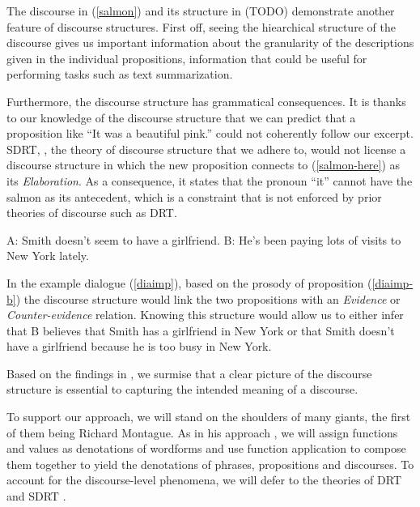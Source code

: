 
The discourse in (\ref{salmon}) and its structure in (TODO) demonstrate
another feature of discourse structures. First off, seeing the
hiearchical structure of the discourse gives us important information
about the granularity of the descriptions given in the individual
propositions, information that could be useful for performing tasks such
as text summarization.

Furthermore, the discourse structure has grammatical consequences. It is
thanks to our knowledge of the discourse structure that we can predict
that a proposition like ``It was a beautiful pink.''  could not
coherently follow our excerpt. SDRT, \cite{asher2003logics}, the theory
of discourse structure that we adhere to, would not license a discourse
structure in which the new proposition connects to (\ref{salmon-here})
as its \emph{Elaboration}. As a consequence, it states that the pronoun
``it'' cannot have the salmon as its antecedent, which is a constraint
that is not enforced by prior theories of discourse such as DRT.

\begin{exe}
  \ex \label{diaimp} \begin{xlist}
    \ex A: Smith doesn't seem to have a girlfriend.
    \ex \label{diaimp-b} B: He's been paying lots of visits to New York lately.
  \end{xlist}
\end{exe}

In the example dialogue (\ref{diaimp}), based on the prosody of
proposition (\ref{diaimp-b}) the discourse structure would link the two
propositions with an \emph{Evidence} or \emph{Counter-evidence}
relation. Knowing this structure would allow us to either infer that B
believes that Smith has a girlfriend in New York or that Smith doesn't
have a girlfriend because he is too busy in New York.

Based on the findings in \cite{asher2003logics}, we surmise that a clear
picture of the discourse structure is essential to capturing the
intended meaning of a discourse.

To support our approach, we will stand on the shoulders of many giants,
the first of them being Richard Montague. As in his approach
\cite{montague1973proper}, we will assign functions and values as
denotations of wordforms and use function application to compose them
together to yield the denotations of phrases, propositions and
discourses. To account for the discourse-level phenomena, we will defer
to the theories of DRT \cite{kamp1993discourse} and SDRT
\cite{asher2003logics}.

